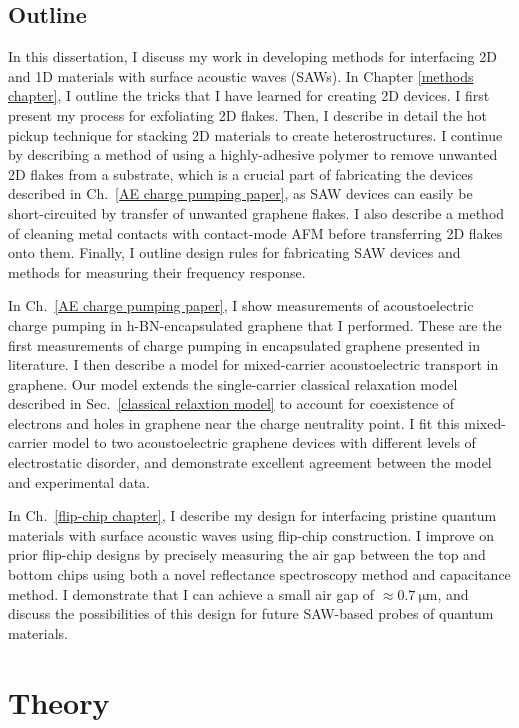 \documentclass{beavtex_dub_edit}
\begin{document}
\section{Outline}
In this dissertation, I discuss my work in developing methods for interfacing 2D and 1D materials with surface acoustic waves (SAWs). In Chapter \ref{methods chapter}, I outline the tricks that I have learned for creating 2D devices. I first present my process for exfoliating 2D flakes. Then, I describe in detail the hot pickup technique for stacking 2D materials to create heterostructures. I continue by describing a method of using a highly-adhesive polymer to remove unwanted 2D flakes from a substrate, which is a crucial part of fabricating the devices described in Ch.\ \ref{AE charge pumping paper}, as SAW devices can easily be short-circuited by transfer of unwanted graphene flakes. I also describe a method of cleaning metal contacts with contact-mode AFM before transferring 2D flakes onto them. Finally, I outline design rules for fabricating SAW devices and methods for measuring their frequency response. 

In Ch.\ \ref{AE charge pumping paper}, I show measurements of acoustoelectric charge pumping in h-BN-encapsulated graphene that I performed. These are the first measurements of charge pumping in encapsulated graphene presented in literature. I then describe a model for mixed-carrier acoustoelectric transport in graphene. Our model extends the single-carrier classical relaxation model described in Sec.\ \ref{classical relaxtion model} to account for coexistence of electrons and holes in graphene near the charge neutrality point. I fit this mixed-carrier model to two acoustoelectric graphene devices with different levels of electrostatic disorder, and demonstrate excellent agreement between the model and experimental data.

In Ch.\ \ref{flip-chip chapter}, I describe my design for interfacing pristine quantum materials with surface acoustic waves using flip-chip construction. I improve on prior flip-chip designs by precisely measuring the air gap between the top and bottom chips using both a novel reflectance spectroscopy method and capacitance method. I demonstrate that I can achieve a small air gap of $\approx \SI{0.7}{\micro\meter}$, and discuss the possibilities of this design for future SAW-based probes of quantum materials.


\chapter{Theory}
\end{document}
